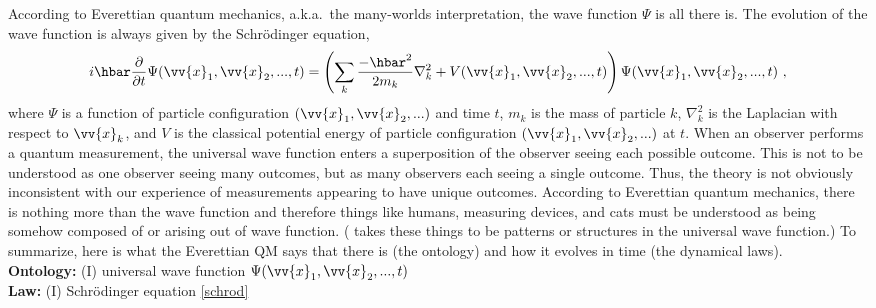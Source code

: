 \documentclass[12pt,secnumarabic,balancelastpage,amsmath,amssymb,nofootinbib]{article}
\begin{document}
According to Everettian quantum mechanics, a.k.a.\ the many-worlds interpretation, the wave function $\Psi$ is all there is.  The evolution of the wave function is always given by the Schr\"{o}dinger equation,
\begin{equation}
i\hbar\frac{\partial}{\partial t}\Psi(\vv{x}_1,\vv{x}_2,...,t)
=\left(\sum_k{\frac{-\hbar^2}{2 m_k}\nabla_k^2}+V(\vv{x}_1,\vv{x}_2,...,t)\right)\Psi(\vv{x}_1,\vv{x}_2,...,t)\ ,
\label{schrod}
\end{equation}
where $\Psi$ is a function of particle configuration $(\vv{x}_1,\vv{x}_2,...)$ and time $t$, $m_k$ is the mass of particle $k$, $\nabla_k^2$ is the Laplacian with respect to $\vv{x}_k$, and $V$ is the classical potential energy of particle configuration $(\vv{x}_1,\vv{x}_2,...)$ at $t$.  When an observer performs a quantum measurement, the universal wave function enters a superposition of the observer seeing each possible outcome.  This is not to be understood as one observer seeing many outcomes, but as many observers each seeing a single outcome. Thus, the theory is not obviously inconsistent with our experience of measurements appearing to have unique outcomes.  According to Everettian quantum mechanics, there is nothing more than the wave function and therefore things like humans, measuring devices, and cats must be understood as being somehow composed of or arising out of wave function.  (\citealp{wallace2003, wallace2012} takes these things to be patterns or structures in the universal wave function.)  To summarize, here is what the Everettian QM says that there is (the ontology) and how it evolves in time (the dynamical laws).
\vspace*{6 pt}\\\hspace*{1.2cm}\textbf{Ontology:} (I) universal wave function $\Psi(\vv{x}_1,\vv{x}_2,...,t)$
\\\hspace*{1.2cm}\textbf{Law:} (I) Schr\"{o}dinger equation \eqref{schrod}
\vspace*{6 pt}
\end{document}
